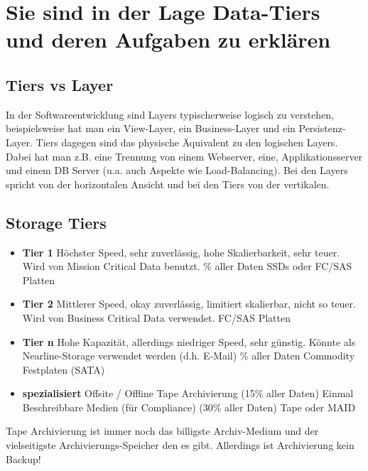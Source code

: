 \section{Sie sind in der Lage Data-Tiers und deren Aufgaben zu erklären}
\subsection{Tiers vs Layer}
In der Softwareentwicklung sind Layers typischerweise logisch zu verstehen, beispielsweise hat man ein View-Layer, ein Business-Layer und ein Persistenz-Layer. Tiers dagegen sind das physische Äquivalent zu den logischen Layers. Dabei hat man z.B. eine Trennung von einem Webserver, eine, Applikationsserver und einem DB Server (u.a. auch Aspekte wie Load-Balancing). Bei den Layers spricht von der horizontalen Ansicht und bei den Tiers von der vertikalen.

\subsection{Storage Tiers}\label{sec:storagetier}
\begin{itemize}
	\item \textbf{Tier 1}
		\subitem Höchster Speed, sehr zuverlässig, hohe Skalierbarkeit, sehr teuer. Wird von Mission Critical Data benutzt.
		\% aller Daten 
		\subitem SSDs oder FC/SAS Platten
	\item \textbf{Tier 2}
		\subitem Mittlerer Speed, okay zuverlässig, limitiert skalierbar, nicht so teuer. Wird von Business Critical Data verwendet.
		\subitem FC/SAS Platten
	\item \textbf{Tier n}
		\subitem Hohe Kapazität, allerdings niedriger Speed, sehr günstig. Könnte als Nearline-Storage verwendet werden (d.h. E-Mail)
		\% aller Daten
		\subitem Commodity Festplaten (SATA)
	\item \textbf{spezialisiert}
		\subitem Offsite / Offline Tape Archivierung (15\% aller Daten)
		\subitem Einmal Beschreibbare Medien (für Compliance) (30\% aller Daten)
		\subitem Tape oder MAID
\end{itemize}
Tape Archivierung ist immer noch das billigste Archiv-Medium und der vielseitigste Archivierungs-Speicher den es gibt. Allerdings ist Archivierung kein Backup!

